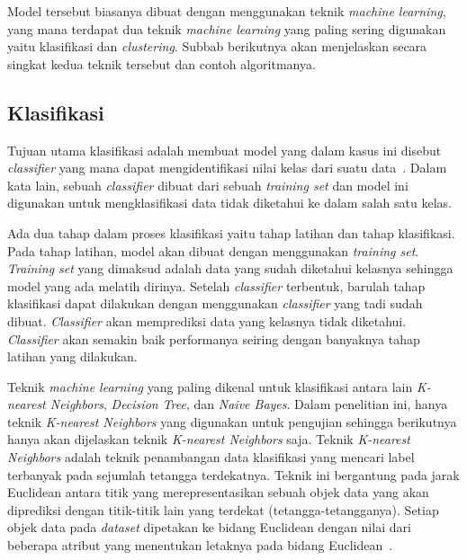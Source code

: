 Model tersebut biasanya dibuat dengan menggunakan teknik \textit{machine learning}, yang mana terdapat dua teknik \textit{machine learning} yang paling sering digunakan yaitu klasifikasi dan \textit{clustering}. Subbab berikutnya akan menjelaskan secara singkat kedua teknik tersebut dan contoh algoritmanya.

\subsection{Klasifikasi}
\label{subsec:klasifikasi}

Tujuan utama klasifikasi adalah membuat model yang dalam kasus ini disebut \textit{classifier} yang mana dapat mengidentifikasi nilai kelas dari suatu data~\cite{mendes:17:ppdmieee}. Dalam kata lain, sebuah \textit{classifier} dibuat dari sebuah \textit{training set} dan model ini digunakan untuk mengklasifikasi data tidak diketahui ke dalam salah satu kelas.

Ada dua tahap dalam proses klasifikasi yaitu tahap latihan dan tahap klasifikasi. Pada tahap latihan, model akan dibuat dengan menggunakan \textit{training set}. \textit{Training set} yang dimaksud adalah data yang sudah diketahui kelasnya sehingga model yang ada melatih dirinya. Setelah \textit{classifier} terbentuk, barulah tahap klasifikasi dapat dilakukan dengan menggunakan \textit{classifier} yang tadi sudah dibuat. \textit{Classifier} akan memprediksi data yang kelasnya tidak diketahui. \textit{Classifier} akan semakin baik performanya seiring dengan banyaknya tahap latihan yang dilakukan.

Teknik \textit{machine learning} yang paling dikenal untuk klasifikasi antara lain \textit{K-nearest Neighbors}, \textit{Decision Tree}, dan \textit{Naive Bayes}. Dalam penelitian ini, hanya teknik \textit{K-nearest Neighbors} yang digunakan untuk pengujian sehingga berikutnya hanya akan dijelaskan teknik \textit{K-nearest Neighbors} saja. Teknik \textit{K-nearest Neighbors} adalah teknik penambangan data klasifikasi yang mencari label terbanyak pada sejumlah tetangga terdekatnya. Teknik ini bergantung pada jarak Euclidean antara titik yang merepresentasikan sebuah objek data yang akan diprediksi dengan titik-titik lain yang terdekat (tetangga-tetangganya). Setiap objek data pada \textit{dataset} dipetakan ke bidang Euclidean dengan nilai dari beberapa atribut yang menentukan letaknya pada bidang Euclidean~\cite{jiawei:12:datmin}.

